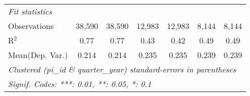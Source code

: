 \begin{tabular}{lcccccc}
   \emph{Fit statistics}\\
   Observations                                                & 38,590        & 38,590       & 12,983        & 12,983        & 8,144         & 8,144\\  
   R$^2$                                                       & 0.77          & 0.77         & 0.43          & 0.42          & 0.49          & 0.49\\  
Mean(Dep. Var.) & 0.214 & 0.214 & 0.235 & 0.235 & 0.239 & 0.239 \\
   \midrule \midrule
   \multicolumn{7}{l}{\emph{Clustered (pi\_id \& quarter\_year) standard-errors in parentheses}}\\
   \multicolumn{7}{l}{\emph{Signif. Codes: ***: 0.01, **: 0.05, *: 0.1}}\\
\end{tabular}
\par\endgroup
